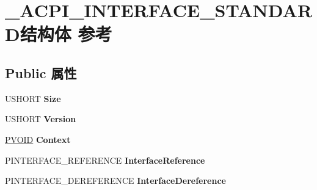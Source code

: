 \hypertarget{struct___a_c_p_i___i_n_t_e_r_f_a_c_e___s_t_a_n_d_a_r_d}{}\section{\+\_\+\+A\+C\+P\+I\+\_\+\+I\+N\+T\+E\+R\+F\+A\+C\+E\+\_\+\+S\+T\+A\+N\+D\+A\+R\+D结构体 参考}
\label{struct___a_c_p_i___i_n_t_e_r_f_a_c_e___s_t_a_n_d_a_r_d}
\subsection*{Public 属性}
\begin{DoxyCompactItemize}
\item 
\mbox{\label{struct___a_c_p_i___i_n_t_e_r_f_a_c_e___s_t_a_n_d_a_r_d_ac475db335925b8f5488dd6a78dda750b}} 
U\+S\+H\+O\+RT {\bfseries Size}
\item 
\mbox{\label{struct___a_c_p_i___i_n_t_e_r_f_a_c_e___s_t_a_n_d_a_r_d_a7e62e65d283c03781c89d40c7c9a4db7}} 
U\+S\+H\+O\+RT {\bfseries Version}
\item 
\mbox{\label{struct___a_c_p_i___i_n_t_e_r_f_a_c_e___s_t_a_n_d_a_r_d_a05de76260b566f8afa14502bbdd51fe3}} 
\hyperlink{interfacevoid}{P\+V\+O\+ID} {\bfseries Context}
\item 
\mbox{\label{struct___a_c_p_i___i_n_t_e_r_f_a_c_e___s_t_a_n_d_a_r_d_a659d63d48ec211e1bd533c42b9eb0362}} 
P\+I\+N\+T\+E\+R\+F\+A\+C\+E\+\_\+\+R\+E\+F\+E\+R\+E\+N\+CE {\bfseries Interface\+Reference}
\item 
\mbox{\label{struct___a_c_p_i___i_n_t_e_r_f_a_c_e___s_t_a_n_d_a_r_d_a2b377cda801968360ddf607f70bca210}} 
P\+I\+N\+T\+E\+R\+F\+A\+C\+E\+\_\+\+D\+E\+R\+E\+F\+E\+R\+E\+N\+CE {\bfseries Interface\+Dereference}
\item 
\mbox{\label{struct___a_c_p_i___i_n_t_e_r_f_a_c_e___s_t_a_n_d_a_r_d_ab60578d1c98a9aaf0d49202e9f486288}} 

\end{DoxyCompactItemize}
